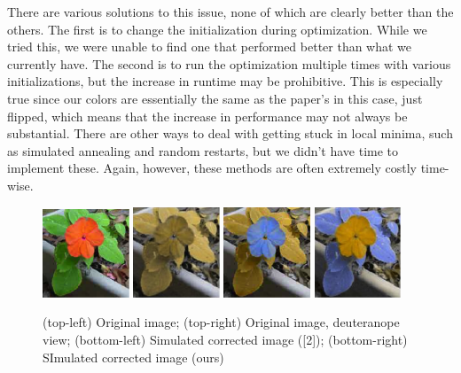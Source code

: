 \documentclass[10pt,twocolumn,letterpaper]{article}
\begin{document}
There are various solutions to this issue, none of which are clearly better than the others. The first is to change the initialization during optimization. While we tried this, we were unable to find one that performed better than what we currently have. The second is to run the optimization multiple times with various initializations, but the increase in runtime may be prohibitive. This is especially true since our colors are essentially the same as the paper's in this case, just flipped, which means that the increase in performance may not always be substantial. There are other ways to deal with getting stuck in local minima, such as simulated annealing and random restarts, but we didn't have time to implement these. Again, however, these methods are often extremely costly time-wise. 

\begin{figure}[h]
  \includegraphics[width=0.23\textwidth]{flower1.png}
  \includegraphics[width=0.23\textwidth]{flower2.png}
  \includegraphics[width=0.23\textwidth]{flower3.png}
  \includegraphics[width=0.23\textwidth]{flower4.png}
  \caption{(top-left) Original image; (top-right) Original image, deuteranope view; (bottom-left) Simulated corrected image ([2]); (bottom-right) SImulated corrected image (ours)}
  \label{fig:flower}
\end{figure}
\end{document}
